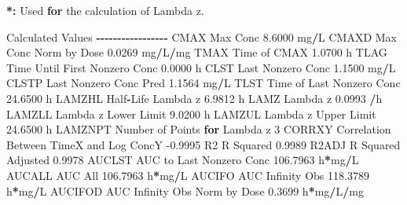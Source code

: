 \documentclass[
  10pt,
]{krantz}
\makeatletter
\newenvironment{Shaded}{\begin{snugshade}}{\end{snugshade}}
\newcommand{\ControlFlowTok}[1]{\textcolor[rgb]{0.13,0.29,0.53}{\textbf{#1}}}
\newcommand{\DecValTok}[1]{\textcolor[rgb]{0.00,0.00,0.81}{#1}}
\newcommand{\ErrorTok}[1]{\textcolor[rgb]{0.64,0.00,0.00}{\textbf{#1}}}
\newcommand{\FloatTok}[1]{\textcolor[rgb]{0.00,0.00,0.81}{#1}}
\newcommand{\NormalTok}[1]{#1}
\newcommand{\OperatorTok}[1]{\textcolor[rgb]{0.81,0.36,0.00}{\textbf{#1}}}
\newcommand{\StringTok}[1]{\textcolor[rgb]{0.31,0.60,0.02}{#1}}
\newenvironment{kframe}{%
\medskip{}
\setlength{\fboxsep}{.8em}
 \def\at@end@of@kframe{}%
 \ifinner\ifhmode%
  \def\at@end@of@kframe{\end{minipage}}%
  \begin{minipage}{\columnwidth}%
 \fi\fi%
 \def\FrameCommand##1{\hskip\@totalleftmargin \hskip-\fboxsep
 \colorbox{shadecolor}{##1}\hskip-\fboxsep
     \hskip-\linewidth \hskip-\@totalleftmargin \hskip\columnwidth}%
 \MakeFramed {\advance\hsize-\width
   \@totalleftmargin\z@ \linewidth\hsize
   \@setminipage}}%
 {\par\unskip\endMakeFramed%
 \at@end@of@kframe}
\renewenvironment{Shaded}{\begin{kframe}}{\end{kframe}}
\makeatother
\begin{document}
\begin{Shaded}
\begin{Highlighting}[]
\OperatorTok{*}\ErrorTok{:}\StringTok{ }\NormalTok{Used }\ControlFlowTok{for}\NormalTok{ the calculation of Lambda z.}


\NormalTok{Calculated Values}
\OperatorTok{{-}{-}{-}{-}{-}{-}{-}{-}{-}{-}{-}{-}{-}{-}{-}{-}{-}}
\NormalTok{CMAX       Max Conc                                        }\FloatTok{8.6000}\NormalTok{ mg}\OperatorTok{/}\NormalTok{L}
\NormalTok{CMAXD      Max Conc Norm by Dose                           }\FloatTok{0.0269}\NormalTok{ mg}\OperatorTok{/}\NormalTok{L}\OperatorTok{/}\NormalTok{mg}
\NormalTok{TMAX       Time of CMAX                                    }\FloatTok{1.0700}\NormalTok{ h}
\NormalTok{TLAG       Time Until First Nonzero Conc                   }\FloatTok{0.0000}\NormalTok{ h}
\NormalTok{CLST       Last Nonzero Conc                               }\FloatTok{1.1500}\NormalTok{ mg}\OperatorTok{/}\NormalTok{L}
\NormalTok{CLSTP      Last Nonzero Conc Pred                          }\FloatTok{1.1564}\NormalTok{ mg}\OperatorTok{/}\NormalTok{L}
\NormalTok{TLST       Time of Last Nonzero Conc                      }\FloatTok{24.6500}\NormalTok{ h}
\NormalTok{LAMZHL     Half}\OperatorTok{{-}}\NormalTok{Life Lambda z                              }\FloatTok{6.9812}\NormalTok{ h}
\NormalTok{LAMZ       Lambda z                                        }\FloatTok{0.0993} \OperatorTok{/}\NormalTok{h}
\NormalTok{LAMZLL     Lambda z Lower Limit                            }\FloatTok{9.0200}\NormalTok{ h}
\NormalTok{LAMZUL     Lambda z Upper Limit                           }\FloatTok{24.6500}\NormalTok{ h}
\NormalTok{LAMZNPT    Number of Points }\ControlFlowTok{for}\NormalTok{ Lambda z                   }\DecValTok{3}
\NormalTok{CORRXY     Correlation Between TimeX and Log ConcY        }\FloatTok{{-}0.9995} 
\NormalTok{R2         R Squared                                       }\FloatTok{0.9989} 
\NormalTok{R2ADJ      R Squared Adjusted                              }\FloatTok{0.9978} 
\NormalTok{AUCLST     AUC to Last Nonzero Conc                      }\FloatTok{106.7963}\NormalTok{ h}\OperatorTok{*}\NormalTok{mg}\OperatorTok{/}\NormalTok{L}
\NormalTok{AUCALL     AUC All                                       }\FloatTok{106.7963}\NormalTok{ h}\OperatorTok{*}\NormalTok{mg}\OperatorTok{/}\NormalTok{L}
\NormalTok{AUCIFO     AUC Infinity Obs                              }\FloatTok{118.3789}\NormalTok{ h}\OperatorTok{*}\NormalTok{mg}\OperatorTok{/}\NormalTok{L}
\NormalTok{AUCIFOD    AUC Infinity Obs Norm by Dose                   }\FloatTok{0.3699}\NormalTok{ h}\OperatorTok{*}\NormalTok{mg}\OperatorTok{/}\NormalTok{L}\OperatorTok{/}\NormalTok{mg}

\end{Highlighting}
\end{Shaded}
\end{document}
